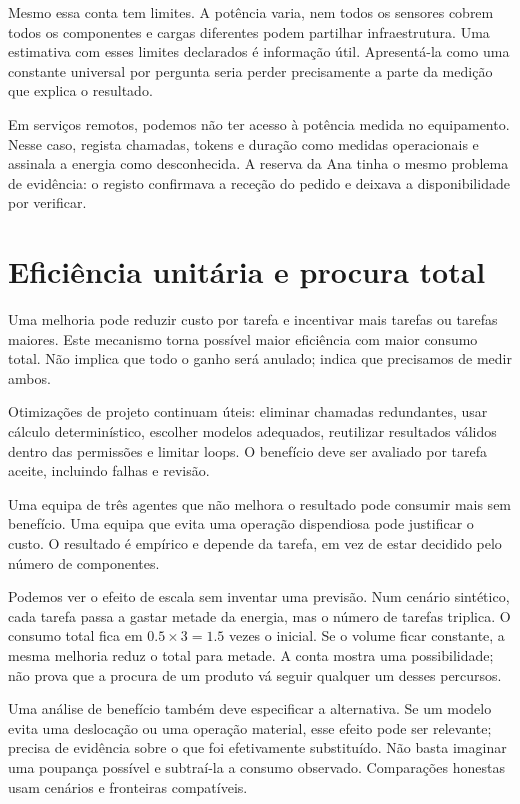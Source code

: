 Mesmo essa conta tem limites. A potência varia, nem todos os sensores cobrem todos os componentes e cargas diferentes podem partilhar infraestrutura. Uma estimativa com esses limites declarados é informação útil. Apresentá-la como uma constante universal por pergunta seria perder precisamente a parte da medição que explica o resultado.

Em serviços remotos, podemos não ter acesso à potência medida no equipamento. Nesse caso, regista chamadas, tokens e duração como medidas operacionais e assinala a energia como desconhecida. A reserva da Ana tinha o mesmo problema de evidência: o registo confirmava a receção do pedido e deixava a disponibilidade por verificar.

\section{Eficiência unitária e procura total}
Uma melhoria pode reduzir custo por tarefa e incentivar mais tarefas ou tarefas maiores. Este mecanismo torna possível maior eficiência com maior consumo total. Não implica que todo o ganho será anulado; indica que precisamos de medir ambos.

Otimizações de projeto continuam úteis: eliminar chamadas redundantes, usar cálculo determinístico, escolher modelos adequados, reutilizar resultados válidos dentro das permissões e limitar loops. O benefício deve ser avaliado por tarefa aceite, incluindo falhas e revisão.

Uma equipa de três agentes que não melhora o resultado pode consumir mais sem benefício. Uma equipa que evita uma operação dispendiosa pode justificar o custo. O resultado é empírico e depende da tarefa, em vez de estar decidido pelo número de componentes.

Podemos ver o efeito de escala sem inventar uma previsão. Num cenário sintético, cada tarefa passa a gastar metade da energia, mas o número de tarefas triplica. O consumo total fica em $0.5\times3=1.5$ vezes o inicial. Se o volume ficar constante, a mesma melhoria reduz o total para metade. A conta mostra uma possibilidade; não prova que a procura de um produto vá seguir qualquer um desses percursos.

Uma análise de benefício também deve especificar a alternativa. Se um modelo evita uma deslocação ou uma operação material, esse efeito pode ser relevante; precisa de evidência sobre o que foi efetivamente substituído. Não basta imaginar uma poupança possível e subtraí-la a consumo observado. Comparações honestas usam cenários e fronteiras compatíveis.

